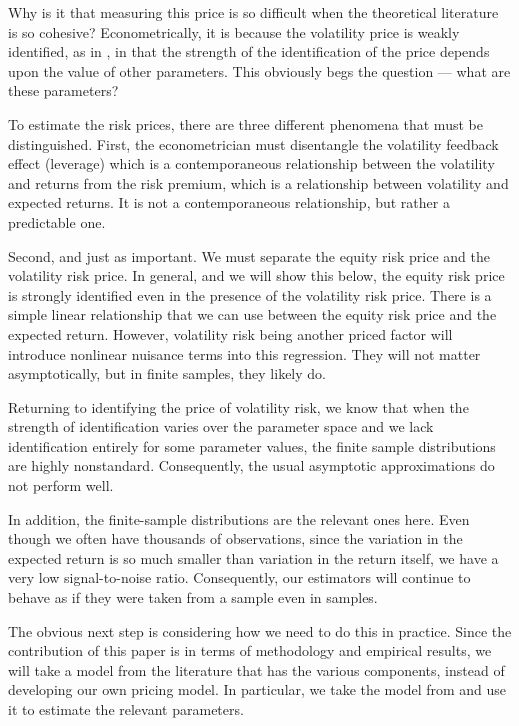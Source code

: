 \documentclass[11pt, letterpaper, twoside, final]{article}
\begin{document}
Why is it that measuring this price is so difficult when the theoretical literature is so cohesive?
Econometrically, it is because the volatility price is weakly identified, as in \textcite{andrews2012estimation},
in that the strength of the identification of the price depends upon the value of other parameters. 
This obviously begs the question --- what are these parameters? 

To estimate the risk prices, there are three different phenomena that must be distinguished.
First, the econometrician must disentangle the volatility feedback effect (leverage) which is a contemporaneous
relationship between the volatility and returns from the risk premium, which is a relationship between volatility
and expected returns. 
It is not a contemporaneous relationship, but rather a predictable one. 

Second, and just as important.
We must separate the equity risk price and the volatility risk price. 
In general, and we will show this below, the equity risk price is strongly identified even in the presence of the
volatility risk price. 
There is a simple linear relationship that we can use between the equity risk price and the expected return.
However, volatility risk being another priced factor will introduce nonlinear nuisance terms into this regression. 
They will not matter asymptotically, but in finite samples, they likely do.

Returning to identifying the price of volatility risk, we know that when the strength of identification varies over
the parameter space and we lack identification entirely for some parameter values, the finite sample distributions
are highly nonstandard. 
Consequently, the usual asymptotic approximations do not perform well. 

In addition, the finite-sample distributions are the relevant ones here. 
Even though we often have thousands of observations, since the variation in the expected return is so much smaller
than variation in the return itself, we have a very low signal-to-noise ratio.
Consequently, our estimators will continue to behave as if they were taken from a  sample even in
 samples.

The obvious next step is considering how we need to do this in practice.
Since the contribution of this paper is in terms of methodology and empirical results, we will take a model from
the literature that has the various components, instead of developing our own pricing model.
In particular, we take the model from \textcite{khrapov2016affine} and use it to estimate the relevant parameters. 
\end{document}
